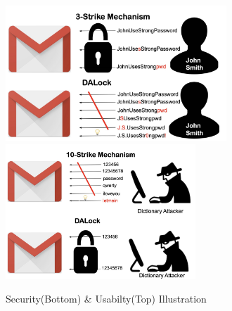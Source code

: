 \begin{figure}[htb]
	\begin{center}
		\includegraphics[height=2.0in,width=\linewidth]{Figures/Introduction/Usability.png}
		\includegraphics[height=2.0in,width=\linewidth]{Figures/Introduction/Security.png}	
\vspace{-0.2cm}	
		\caption{Security(Bottom) \& Usabilty(Top) Illustration}\label{figure:introduction_security}
	\end{center}
\end{figure}
\vspace*{-\baselineskip}
\vspace*{-\baselineskip}

